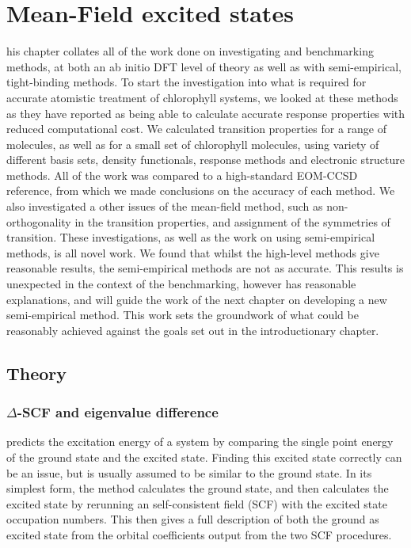 %
%
\chapter{Mean-Field excited states}
\label{chap:dscf}

his chapter collates all of the work done on investigating and benchmarking
\dscf methods, at both an ab initio DFT level of theory as well as with semi-empirical, 
tight-binding methods. To start the investigation into what is required for accurate
atomistic treatment of chlorophyll systems, we looked at these methods as they have
reported as being able to calculate accurate response properties with reduced computational
cost.
We calculated transition properties for a range of molecules, as well as
for a small set of chlorophyll molecules, using variety of different basis sets,
density functionals, response methods and electronic structure methods. All of 
the work was compared to a high-standard EOM-CCSD reference, from which we made conclusions
on the accuracy of each method. We also investigated a other issues of the mean-field
\dscf method, such as non-orthogonality in the transition properties, and assignment
of the symmetries of transition. These investigations, as well as the work on using 
semi-empirical methods, is all novel work. 
We found that whilst the high-level methods give reasonable results, the semi-empirical
\dscf methods are not as accurate. This results is unexpected in the context of
the benchmarking, however has reasonable explanations, and will guide the work
of the next chapter on developing a new semi-empirical method. This work sets the
groundwork of what could be reasonably achieved against the goals set out in the
introductionary chapter.

\section{Theory}
\label{sec:dscf_theory}
\subsection{$\Delta$-SCF and eigenvalue difference}
\label{subsec{dscf_and_eigdiff}}

\dscf predicts the excitation energy of a system by comparing the single point
energy of the ground state and the excited state. Finding this excited state
correctly can be an issue, but is usually assumed to be similar to the ground
state. In its simplest form, the \dscf method calculates the ground state, and
then calculates the excited state by rerunning an self-consistent field (SCF) 
with the excited state occupation numbers. This then gives a full description 
of both the ground as excited state from the orbital coefficients output from 
the two SCF procedures.

